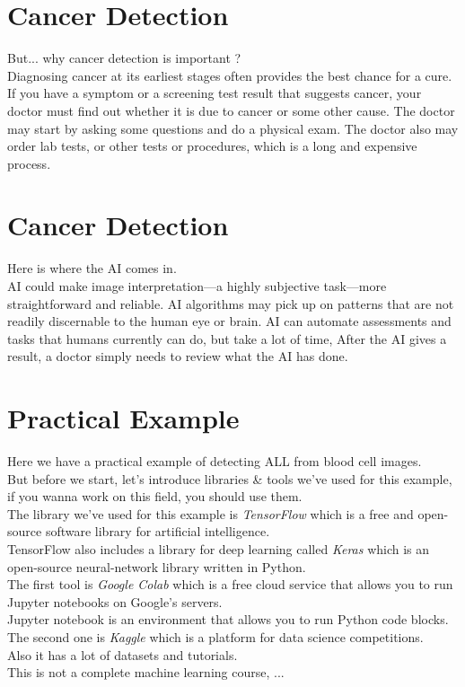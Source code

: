 \documentclass{SBCbookchapter}
\begin{document}
\section*{Cancer Detection}
But... why cancer detection is important ? \\
Diagnosing cancer at its earliest stages often provides the
best chance for a cure. \\
If you have a symptom or a screening test result that suggests cancer,
your doctor must find out whether it is due to cancer or some other
cause.
The doctor may start by asking some questions and do a physical exam. 
The doctor also may order lab tests, or other tests or procedures,
which is a long and expensive process.

\section*{Cancer Detection}
Here is where the AI comes in. \\
AI could make image interpretation—a highly subjective task—more
straightforward and reliable.
AI algorithms may pick up on patterns that are not readily
discernable to the human eye or brain.
AI can automate assessments and tasks that humans currently can
do, but take a lot of time, After the AI gives a result, a doctor simply
needs to review what the AI has done.

\section*{Practical Example}
Here we have a practical example of detecting ALL from blood cell images. \\
But before we start, let's introduce libraries \& tools we've used for this example, if you wanna
work on this field, you should use them. \\
The library we've used for this example is \textit{TensorFlow} which is a free and open-source software library for artificial intelligence. \\
TensorFlow also includes a library for deep learning called \textit{Keras} which is an open-source neural-network library written in Python. \\
The first tool is \textit{Google Colab} which is a free cloud service
that allows you to run Jupyter notebooks on Google's servers. \\
Jupyter notebook is an environment that allows you to run Python code blocks. \\
The second one is \textit{Kaggle} which is a platform for data science competitions. \\
Also it has a lot of datasets and tutorials. \\
This is not a complete machine learning course, ...
\end{document}
